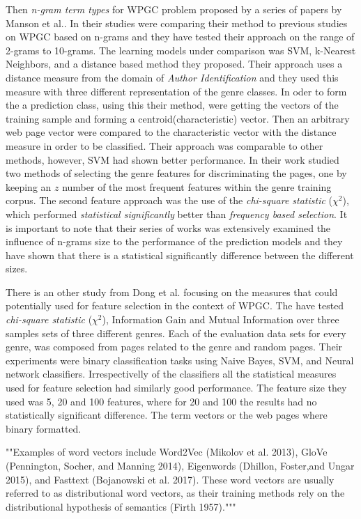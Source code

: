 Then \textit{n-gram term types} for WPGC problem proposed by a series of papers by Manson et al.\parencite{mason2009n,mason2009classifying,mason2009distance}. In their studies were comparing their method to previous studies on WPGC based on n-grams and they have tested their approach on the range of 2-grams to 10-grams. The learning models under comparison was SVM, k-Nearest Neighbors, and a distance based method they proposed. Their approach uses a distance measure from the domain of \textit{Author Identification} and they used this measure with three different representation of the genre classes. In oder to form the a prediction class, using this their method, were getting the vectors of the training sample and forming a centroid(characteristic) vector. Then an arbitrary web page vector were compared to the characteristic vector with the distance measure in order to be classified. Their approach was comparable to other methods, however, SVM had shown better performance. In their work studied two methods of selecting the genre features for discriminating the pages, one by keeping an $z$ number of the most frequent features within the genre training corpus. The second feature approach was the use of the \textit{chi-square statistic} ($\chi^{2}$), which performed \textit{statistical significantly} better than \textit{frequency based selection}. It is important to note that their series of works was extensively examined the influence of n-grams size to the performance of the prediction models and they have shown that there is a statistical
significantly difference between the different sizes.

There is an other study from Dong et al.\parencite{dong2006binary} focusing on the measures that could potentially used for feature selection in the context of WPGC. The have tested\textit{ chi-square statistic} ($\chi^{2}$), Information Gain and Mutual Information over three samples sets of three different genres. Each of the evaluation data sets for every genre, was composed from pages related to the genre and random pages. Their experiments were binary classification tasks using Naive Bayes, SVM, and Neural network classifiers. Irrespectivelly of the classifiers all the statistical measures used for feature selection had similarly good performance. The feature size they used was 5, 20 and 100 features, where for 20 and 100 the results had no statistically significant difference. The term vectors or the web pages where binary formatted.


""Examples of word vectors include Word2Vec (Mikolov et al. 2013), GloVe (Pennington, Socher, and Manning 2014), Eigenwords (Dhillon, Foster,and Ungar 2015), and Fasttext (Bojanowski et al. 2017). These word vectors are usually referred to as distributional word vectors, as their training methods rely on the distributional hypothesis of semantics (Firth 1957)."""


